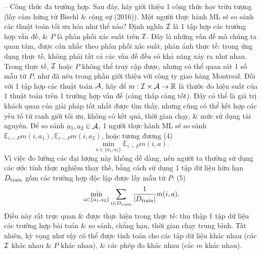 \documentclass{article}
\begin{document}
\begin{itemize}
\begin{itemize}
        -- {\sf Công thức đa trường hợp.} Sau đây, hãy giới thiệu 1 công thức học trừu tượng (lấy cảm hứng từ Bischl \& cộng sự (2016)). Một người thực hành ML sẽ so sánh các thuật toán tối ưu hóa như thế nào? Định nghĩa ${\cal I}$ là 1 tập hợp các trường hợp vấn đề, \& $P$ là phân phối xác suất trên ${\cal I}$. Đây là những vấn đề mà chúng ta quan tâm, được cân nhắc theo phân phối xác suất, phản ánh thực tế: trong ứng dụng thực tế, không phải tất cả các vấn đề đều có khả năng xảy ra như nhau. Trong thực tế, ${\cal I}$ hoặc $P$ không thể truy cập được, nhưng có thể quan sát 1 số mẫu từ $P$, như đã nêu trong phần giới thiệu với công ty giao hàng Montreal. Đối với 1 tập hợp các thuật toán ${\cal A}$, hãy để $m:{\cal I}\times{\cal A}\to\mathbb{R}$ là thước đo hiệu suất của 1 thuật toán trên 1 trường hợp vấn đề (càng thấp càng tốt). Đây có thể là giá trị khách quan của giải pháp tốt nhất được tìm thấy, nhưng cũng có thể kết hợp các yếu tố từ ranh giới tối ưu, không có kết quả, thời gian chạy, \& mức sử dụng tài nguyên. Để so sánh $a_1,a_2\in{\cal A}$, 1 người thực hành ML sẽ so sánh $\mathbb{E}_{i\sim P} m(i,a_1),\mathbb{E}_{i\sim P} m(i,a_2)$, hoặc tương đương (4)
        \begin{equation*}
            \min_{a\in\{a_1,a_2\}} \mathbb{E}_{i\sim P} m(i,a).
        \end{equation*}
        Vì việc đo lường các đại lượng này không dễ dàng, nên người ta thường sử dụng các ước tính thực nghiệm thay thế, bằng cách sử dụng 1 tập dữ liệu hữu hạn $D_{\rm train}$ gồm các trường hợp độc lập được lấy mẫu từ $P$: (5)
        \begin{equation*}
            \min_{a\in\{a_1,a_2\}} \sum_{i\in D_{\rm train}} \frac{1}{|D_{\rm train}|}m(i,a).
        \end{equation*}
        Điều này rất trực quan \& được thực hiện trong thực tế: thu thập 1 tập dữ liệu các trường hợp bài toán \& so sánh, chẳng hạn, thời gian chạy trung bình. Tất nhiên, kỳ vọng như vậy có thể được tính toán cho các tập dữ liệu khác nhau (các ${\cal I}$ khác nhau \& $P$ khác nhau), \& các phép đo khác nhau (các $m$ khác nhau).


\end{itemize}
\end{itemize}
\end{document}

